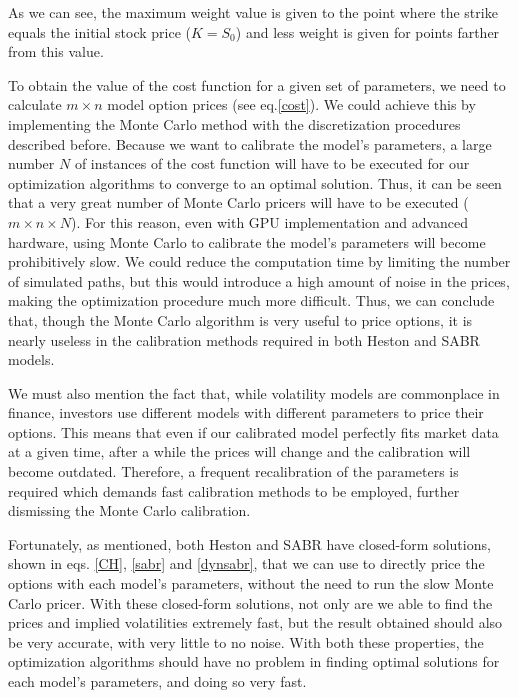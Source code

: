 \noindent As we can see, the maximum weight value is given to the point where the strike equals the initial stock price ($K=S_0$) and less weight is given for points farther from this value.

To obtain the value of the cost function for a given set of parameters, we need to calculate $m\times n$ model option prices (see eq.\eqref{cost}). We could achieve this by implementing the Monte Carlo method with the discretization procedures described before.
Because we want to calibrate the model's parameters, a large number $N$ of instances of the cost function will have to be executed for our optimization algorithms to converge to an optimal solution.
Thus, it can be seen that a very great number of Monte Carlo pricers will have to be executed ($m\times n\times N$). For this reason, even with GPU implementation and advanced hardware, using Monte Carlo to calibrate the model's parameters will become prohibitively slow. We could reduce the computation time by limiting the number of simulated paths, but this would introduce a high amount of noise in the prices, making the optimization procedure much more difficult.
Thus, we can conclude that, though the Monte Carlo algorithm is very useful to price options, it is nearly useless in the calibration methods required in both Heston and SABR models.


We must also mention the fact that, while volatility models are commonplace in finance, investors use different models with different parameters to price their options. This means that even if our calibrated model perfectly fits market data at a given time, after a while the prices will change and the calibration will become outdated. Therefore, a frequent recalibration of the parameters is required which demands fast calibration methods to be employed, further dismissing the Monte Carlo calibration.


Fortunately, as mentioned, both Heston and SABR have closed-form solutions, shown in eqs. \eqref{CH}, \eqref{sabr} and \eqref{dynsabr}, that we can use to directly price the options with each model's parameters, without the need to run the slow Monte Carlo pricer. With these closed-form solutions, not only are we able to find the prices and implied volatilities extremely fast, but the result obtained should also be very accurate, with very little to no noise. With both these properties, the optimization algorithms should have no problem in finding optimal solutions for each model's parameters, and doing so very fast.





